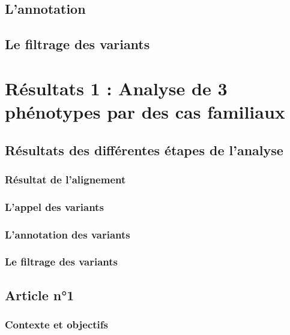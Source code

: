 \documentclass[12pt,a4paper,twoside]{ugathesis}
\begin{document}
\subsection{L'annotation}\label{lannotation}

\subsection{Le filtrage des variants}\label{le-filtrage-des-variants-1}

\section{Résultats 1 : Analyse de 3 phénotypes par des cas
familiaux}\label{resultats-1-analyse-de-3-phenotypes-par-des-cas-familiaux}

\subsection{Résultats des différentes étapes de
l'analyse}\label{resultats-des-differentes-etapes-de-lanalyse}

\subsubsection{Résultat de l'alignement}\label{resultat-de-lalignement}

\subsubsection{L'appel des variants}\label{lappel-des-variants-1}

\subsubsection{L'annotation des
variants}\label{lannotation-des-variants-1}

\subsubsection{Le filtrage des
variants}\label{le-filtrage-des-variants-2}

\subsection{Article n°1}\label{article-n1}

\subsubsection{Contexte et objectifs}\label{contexte-et-objectifs}
\end{document}

